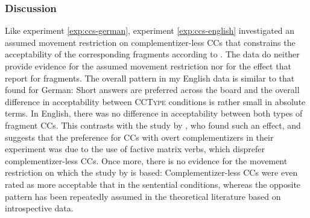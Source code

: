 \subsubsection{Discussion}
Like experiment \ref{exp:ccs-german}, experiment \ref{exp:ccs-english} investigated an assumed movement restriction on complementizer-less CCs that constrains the acceptability of the corresponding fragments according to \citet{merchant.etal2013}. The data do neither provide evidence for the assumed movement restriction nor for the effect that \citet{merchant.etal2013} report for fragments. The overall pattern in my English data is similar to that found for German: Short answers are preferred across the board and the overall difference in acceptability between \textsc{CCType} conditions is rather small in absolute terms. In English, there was no difference in acceptability between both types of fragment CCs. This contrasts with the study by \citet{merchant.etal2013}, who found such an effect, and suggests that the preference for CCs with overt complementizers in their experiment was due to the use of factive matrix verbs, which disprefer complementizer-less CCs. Once more, there is no evidence for the movement restriction on which the study by \citet{merchant.etal2013} is based: Complementizer-less CCs were even rated as more acceptable that in the sentential conditions, whereas the opposite pattern has been repeatedly assumed in the theoretical literature based on introspective data.

